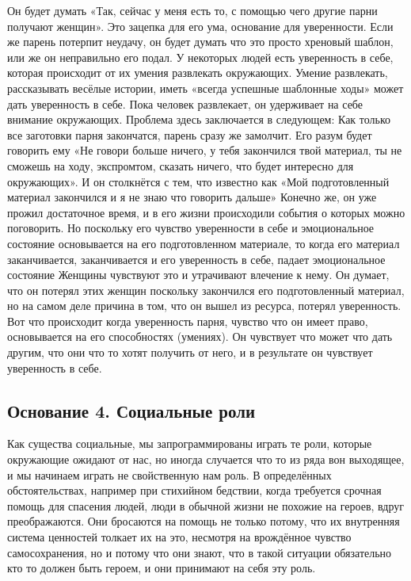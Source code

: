 Он будет думать «Так, сейчас у меня есть то, с помощью чего другие парни получают женщин». Это зацепка для его ума, основание для уверенности. Если же парень потерпит неудачу, он будет думать что это просто хреновый шаблон, или же он неправильно его подал. У некоторых людей есть уверенность в себе, которая происходит от их умения развлекать окружающих. Умение развлекать, рассказывать весёлые истории, иметь «всегда успешные шаблонные ходы» может дать уверенность в себе. Пока человек развлекает, он удерживает на себе внимание окружающих. Проблема здесь заключается в следующем: Как только все заготовки парня закончатся, парень сразу же замолчит. Его разум будет говорить ему «Не говори больше ничего, у тебя закончился твой материал, ты не сможешь на ходу, экспромтом, сказать ничего, что будет интересно для окружающих». И он столкнётся с тем, что известно как «Мой подготовленный материал закончился и я не знаю что говорить дальше» Конечно же, он уже прожил достаточное время, и в его жизни происходили события о которых можно поговорить. Но поскольку его чувство уверенности в себе и эмоциональное состояние основывается на его подготовленном материале, то когда его материал заканчивается, заканчивается и его уверенность в себе, падает эмоциональное состояние Женщины чувствуют это и утрачивают влечение к нему. Он думает, что он потерял этих женщин поскольку закончился его подготовленный материал, но на самом деле причина в том, что он вышел из ресурса, потерял уверенность. Вот что происходит когда уверенность парня, чувство что он имеет право, основывается на его способностях (умениях). Он чувствует что может что дать другим, что они что то хотят получить от него, и в результате он чувствует уверенность в себе.

\subsection{Основание 4. Социальные роли}

Как существа социальные, мы запрограммированы играть те роли, которые окружающие ожидают от нас, но иногда случается что то из ряда вон выходящее, и мы начинаем играть не свойственную нам роль. В определённых обстоятельствах, например при стихийном бедствии, когда требуется срочная помощь для спасения людей, люди в обычной жизни не похожие на героев, вдруг преображаются. Они бросаются на помощь не только потому, что их внутренняя система ценностей толкает их на это, несмотря на врождённое чувство самосохранения, но и потому что они знают, что в такой ситуации обязательно кто то должен быть героем, и они принимают на себя эту роль.

